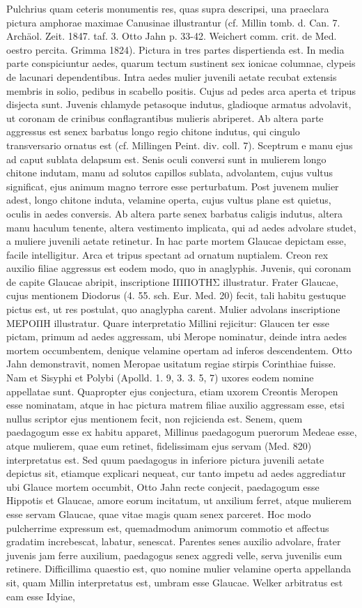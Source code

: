 \documentclass[a4paper, 11pt, oneside, polutonikogreek, german]{article}
\begin{document}
Pulchrius quam ceteris monumentis res, quas supra descripsi, una praeclara pictura amphorae maximae Canusinae illustrantur (cf. Millin tomb. d. Can. 7. Archäol. Zeit. 1847. taf. 3. Otto Jahn p. 33-42. Weichert comm. crit. de Med. oestro percita. Grimma 1824). Pictura in tres partes dispertienda est. In media parte conspiciuntur aedes, quarum tectum sustinent sex ionicae columnae, clypeis de lacunari dependentibus. Intra aedes mulier juvenili aetate recubat extensis membris in solio, pedibus in scabello positis. Cujus ad pedes arca aperta et tripus disjecta sunt. Juvenis chlamyde petasoque indutus, gladioque armatus advolavit, ut coronam de crinibus conflagrantibus mulieris abriperet. Ab altera parte aggressus est senex barbatus longo regio chitone indutus, qui cingulo transversario ornatus est (cf. Millingen Peint. div. coll. 7). Sceptrum e manu ejus ad caput sublata delapsum est. Senis oculi conversi sunt in mulierem longo chitone indutam, manu ad solutos capillos sublata, advolantem, cujus vultus significat, ejus animum magno terrore esse perturbatum. Post juvenem mulier adest, longo chitone induta, velamine operta, cujus vultus plane est quietus, oculis in aedes conversis. Ab altera parte senex barbatus caligis indutus, altera manu haculum tenente, altera vestimento implicata, qui ad aedes advolare studet, a muliere juvenili aetate retinetur. In hac parte mortem Glaucae depictam esse, facile intelligitur. Arca et tripus spectant ad ornatum nuptialem. Creon rex auxilio filiae aggressus est eodem modo, quo in anaglyphis. Juvenis, qui coronam de capite Glaucae abripit, inscriptione ΙΠΠΟΤΗΣ illustratur. Frater Glaucae, cujus mentionem Diodorus (4. 55. sch. Eur. Med. 20) fecit, tali habitu gestuque pictus est, ut res postulat, quo anaglypha carent. Mulier advolans inscriptione ΜΕΡΟΠΗ illustratur. Quare interpretatio Millini rejicitur: Glaucen ter esse pictam, primum ad aedes aggressam, ubi Merope nominatur, deinde intra aedes mortem occumbentem, denique velamine opertam ad inferos descendentem. Otto Jahn demonstravit, nomen Meropae usitatum regiae stirpis Corinthiae fuisse. Nam et Sisyphi et Polybi (Apolld. 1. 9, 3. 3. 5, 7) uxores eodem nomine appellatae sunt. Quapropter ejus conjectura, etiam uxorem Creontis Meropen esse nominatam, atque in hac pictura matrem filiae auxilio aggressam esse, etsi nullus scriptor ejus mentionem fecit, non rejicienda est. Senem, quem paedagogum esse ex habitu apparet, Millinus paedagogum puerorum Medeae esse, atque mulierem, quae eum retinet, fidelissimam ejus servam (Med. 820) interpretatus est. Sed quum paedagogus in inferiore pictura juvenili aetate depictus sit, etiamque explicari nequeat, cur tanto impetu ad aedes aggrediatur ubi Glauce mortem occumbit, Otto Jahn recte conjecit, paedagogum esse Hippotis et Glaucae, amore eorum incitatum, ut anxilium ferret, atque mulierem esse servam Glaucae, quae vitae magis quam senex parceret. Hoc modo pulcherrime expressum est, quemadmodum animorum commotio et affectus gradatim increbescat, labatur, senescat. Parentes senes auxilio advolare, frater juvenis jam ferre auxilium, paedagogus senex aggredi velle, serva juvenilis eum retinere. Difficillima quaestio est, quo nomine mulier velamine operta appellanda sit, quam Millin interpretatus est, umbram esse Glaucae. Welker arbitratus est eam esse Idyiae, 
\end{document}
